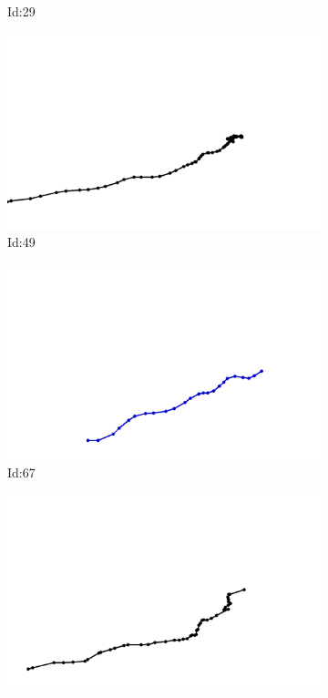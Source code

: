 \documentclass[12pt,twoside]{report}
\begin{document}
\begin{figure}
\begin{subfigure}[b]{0.20\textwidth}
\caption{Id:29}
\end{subfigure}
\begin{subfigure}[b]{0.20\textwidth}
\centering
\includegraphics[width=\textwidth]{../trajectories/49.png}
\caption{Id:49}
\end{subfigure}
\begin{subfigure}[b]{0.20\textwidth}
\centering
\includegraphics[width=\textwidth]{../trajectories/67.png}
\caption{Id:67}
\end{subfigure}
\begin{subfigure}[b]{0.20\textwidth}
\centering
\includegraphics[width=\textwidth]{../trajectories/70.png}

\end{subfigure}
\end{figure}
\end{document}
